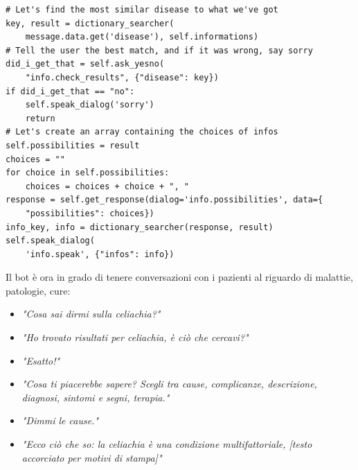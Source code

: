 \begin{verbatim}
# Let's find the most similar disease to what we've got
key, result = dictionary_searcher(
    message.data.get('disease'), self.informations)
# Tell the user the best match, and if it was wrong, say sorry
did_i_get_that = self.ask_yesno(
    "info.check_results", {"disease": key})
if did_i_get_that == "no":
    self.speak_dialog('sorry')
    return
# Let's create an array containing the choices of infos
self.possibilities = result
choices = ""
for choice in self.possibilities:
    choices = choices + choice + ", "
response = self.get_response(dialog='info.possibilities', data={
    "possibilities": choices})
info_key, info = dictionary_searcher(response, result)
self.speak_dialog(
    'info.speak', {"infos": info})
\end{verbatim}
Il bot è ora in grado di tenere conversazioni con i pazienti al riguardo di malattie, patologie, cure:
\begin{itemize}
    \item \textit{"Cosa sai dirmi sulla celiachia?"}
    \item \textit{"Ho trovato risultati per celiachia, è ciò che cercavi?"}
    \item \textit{"Esatto!"}
    \item \textit{"Cosa ti piacerebbe sapere? Scegli tra cause, complicanze, descrizione, diagnosi, sintomi e segni, terapia."}
    \item \textit{"Dimmi le cause."}
    \item \textit{"Ecco ciò che so: la celiachia è una condizione multifattoriale, [testo accorciato per motivi di stampa]"}
\end{itemize}